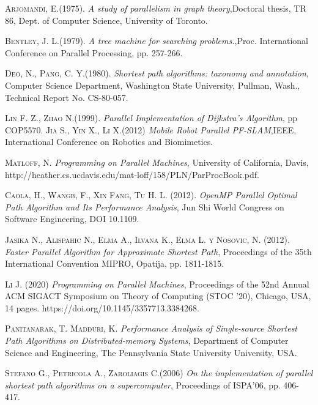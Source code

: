 \documentclass[11pt]{article}
\begin{document}
\begin{thebibliography}{x}
  \textsc{Arjomandi, E.(1975).}
 \textit{A study of parallelism in graph theory},Doctoral thesis, TR 86, Dept. of Computer Science, University of Toronto.
 
  \textsc{Bentley, J. L.(1979).}
 	\textit{A tree machine for searching problems.},Proc. International Conference on Parallel Processing, pp. 257-266. 	
 
   \textsc{Deo, N., Pang, C. Y.(1980).}
   \textit{Shortest path algorithms: taxonomy and annotation}, Computer Science Department, Washington State University, Pullman, Wash., Technical Report No. CS-80-057.
 	
 	  \textsc{Lin F. Z., Zhao N.(1999).} 
 	\textit{Parallel Implementation of Dijkstra's Algorithm}, pp COP5570.	   
  \textsc{Jia S., Yin X., Li X.(2012)}
 \textit{Mobile Robot Parallel PF-SLAM},IEEE, International Conference on Robotics and Biomimetics.  

  \textsc{Matloff, N.} 
 	\textit{Programming on Parallel Machines}, University of California, Davis, http://heather.cs.ucdavis.edu/mat-loff/158/PLN/ParProcBook.pdf.
 
  \textsc{Caola, H., Wangb, F., Xin Fang, Tu H. L. (2012).} 
 	\textit{OpenMP Parallel Optimal Path Algorithm and Its Performance Analysis}, Jun Shi World Congress on Software Engineering, DOI 10.1109.
 	
  \textsc{Jasika N., Alispahic N., Elma A., Ilvana K., Elma L. y Nosovic, N. (2012).} 
 	\textit{Faster Parallel Algorithm for Approximate Shortest Path}, Proceedings of the 35th International Convention MIPRO, Opatija, pp. 1811-1815.
 	
  \textsc{Li J. (2020)} 
 	\textit{Programming on Parallel Machines}, Proceedings of the 52nd Annual ACM SIGACT Symposium on Theory of Computing (STOC ’20), Chicago,  USA, 14 pages. https://doi.org/10.1145/3357713.3384268.

  \textsc{Panitanarak, T. Madduri, K.} 
 	\textit{Performance Analysis of Single-source Shortest Path Algorithms on Distributed-memory Systems}, Department of Computer Science and Engineering, The Pennsylvania State University
University, USA.

  \textsc{Stefano G., Petricola A., Zaroliagis C.(2006)} 
 	\textit{On the implementation of parallel shortest path algorithms on a supercomputer}, Proceedings of ISPA’06, pp. 406-417.


\end{thebibliography}
\end{document}
